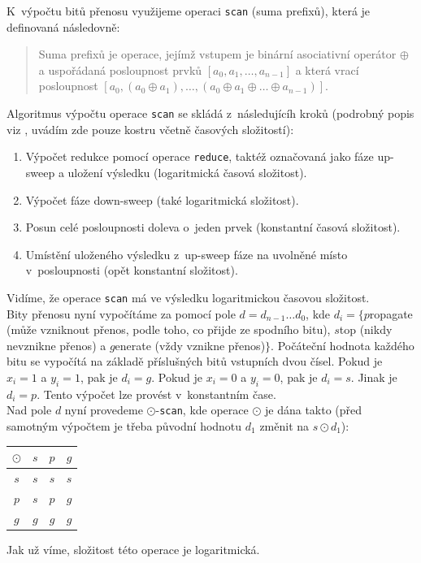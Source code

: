 \documentclass[11pt,a4paper]{article}
\begin{document}
\noindent
K~výpočtu bitů přenosu využijeme operaci \texttt{scan} (suma prefixů), která je
definovaná následovně:
\begin{quote}
	Suma prefixů je operace, jejímž vstupem je binární asociativní operátor
	$\oplus$ a uspořádaná posloupnost prvků $[a_{0}, a_{1}, \dots, a_{n-1}]$ a
	která vrací posloupnost $[a_{0}, (a_{0} \oplus a_{1}), \dots, (a_{0}
	\oplus a_{1} \oplus \dots \oplus a_{n-1})]$.
\end{quote}
Algoritmus výpočtu operace \texttt{scan} se skládá z~následujícíh kroků (podrobný
popis viz \cite{1}, uvádím zde pouze kostru včetně časových složitostí):
\begin{enumerate}
	\item Výpočet redukce pomocí operace \texttt{reduce}, taktéž označovaná jako
		fáze up-sweep a uložení výsledku (logaritmická časová složitost).
	\item Výpočet fáze down-sweep (také logaritmická složitost).
	\item Posun celé posloupnosti doleva o~jeden prvek (konstantní časová složitost).
	\item Umístění uloženého výsledku z~up-sweep fáze na uvolněné místo v~posloupnosti
		(opět konstantní složitost).
\end{enumerate}
Vidíme, že operace \texttt{scan} má ve výsledku logaritmickou časovou složitost. \\

\noindent
Bity přenosu nyní vypočítáme za pomocí pole $d = d_{n-1}\dots d_{0}$, kde
$d_{i} = \{$\underline{$p$}ropagate (může vzniknout přenos, podle toho, co
přijde ze spodního bitu), \underline{$s$}top (nikdy nevznikne přenos) a
\underline{$g$}enerate (vždy vznikne přenos)$\}$.
Počáteční hodnota každého bitu se vypočítá na základě příslušných bitů
vstupních dvou čísel. Pokud je $x_{i} = 1$ a $y_{i} = 1$, pak je
$d_{i} = g$. Pokud je $x_{i} = 0$ a $y_{i} = 0$, pak je
$d_{i} = s$. Jinak je $d_{i} = p$. Tento výpočet lze provést v~konstantním čase. \\

\noindent
Nad pole $d$ nyní provedeme $\odot$-\texttt{scan}, kde operace $\odot$ je dána
takto (před samotným výpočtem je třeba původní hodnotu $d_{1}$
změnit na $s \odot d_{1}$):
\begin{center}
	\begin{tabular}{c | c c c}
		$\odot$ & $s$ & $p$ & $g$ \\
		\hline
		$s$ & $s$ & $s$ & $s$ \\
		$p$ & $s$ & $p$ & $g$ \\
		$g$ & $g$ & $g$ & $g$
	\end{tabular}
\end{center}
Jak už víme, složitost této operace je logaritmická. \\
\end{document}
